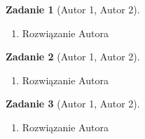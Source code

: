 \documentclass{mwart}
\newtheorem{zad}{Zadanie}[section]
\begin{document}
\begin{zad}[Autor 1, Autor 2]
\end{zad}
\begin{mdframed}
    \begin{enumerate}
        \item Rozwiązanie Autora
    \end{enumerate}
\end{mdframed}

\begin{zad}[Autor 1, Autor 2]
\end{zad}
\begin{mdframed}
    \begin{enumerate}
        \item Rozwiązanie Autora
    \end{enumerate}
\end{mdframed}

\begin{zad}[Autor 1, Autor 2]
\end{zad}
\begin{mdframed}
    \begin{enumerate}
        \item Rozwiązanie Autora
    \end{enumerate}
\end{mdframed}
\end{document}
